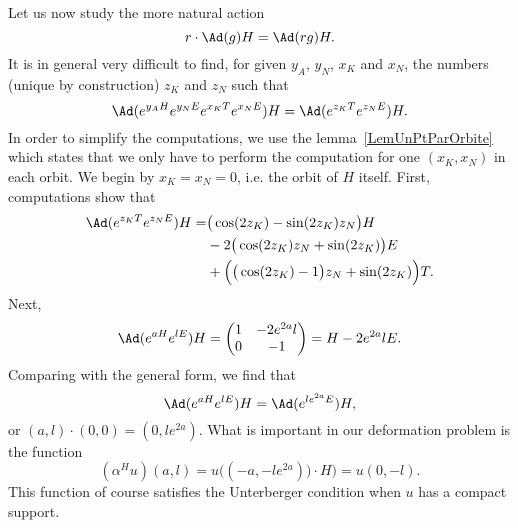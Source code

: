 Let us now study the more natural action
\begin{equation}
  r\cdot \Ad(g)H=\Ad(rg)H.
\end{equation}
It is in general very difficult to find, for given $y_A$, $y_N$, $x_K$ and $x_N$, the numbers (unique by construction) $z_K$ and $z_N$ such that
\[
  \Ad( e^{y_AH} e^{y_NE} e^{x_KT} e^{x_NE})H=\Ad( e^{z_KT} e^{z_NE})H.
\]
In order to simplify the computations, we use the lemma~\ref{LemUnPtParOrbite} which states that we only have to perform the computation for one $(x_K,x_N)$ in each orbit. We begin by $x_K=x_N=0$, i.e. the orbit of $H$ itself. First, computations show that
\[
\begin{split}
\Ad( e^{z_KT} e^{z_NE})H=&\big( \cos(2z_K)-\sin(2z_K)z_N \big)H\\
			&-2\big( \cos(2z_K)z_N+\sin(2z_K) \big)E\\
			&+\Big( \big( \cos(2z_K)-1 \big)z_N+\sin(2z_K) \Big)T.
\end{split}
\]
Next,
\[
  \Ad( e^{aH} e^{lE})H=\begin{pmatrix}
1&-2 e^{2a}l\\
0& -1
\end{pmatrix}
=H-2 e^{2a}lE.
\]
Comparing with the general form, we find that
\begin{equation}
\Ad( e^{aH} e^{lE})H=\Ad( e^{l e^{2a}E})H,
\end{equation}
or $(a,l)\cdot (0,0)=(0,l e^{2a})$. What is important in our deformation problem is the function
\[
  (\alpha^Hu)(a,l)=u\big( (-a,-l e^{2a}))\cdot H \big)=u(0,-l).
\]
This function of course satisfies the Unterberger condition when $u$ has a compact support.


